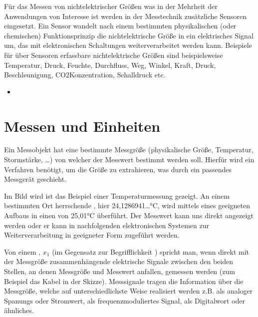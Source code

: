 \documentclass[letterpaper,10pt,english]{jupyterBook}
\begin{document}
\sphinxAtStartPar
Für das Messen von nicht\sphinxhyphen{}elektrischer Größen \sphinxhyphen{} was in der Mehrheit der Anwendungen von Interesse ist \sphinxhyphen{} werden in der Messtechnik zusätzliche Sensoren eingesetzt.
Ein Sensor wandelt nach einem bestimmten physikalischen (oder chemischen) Funktionsprinzip die nicht\sphinxhyphen{}elektrische Größe in ein elektrisches Signal um, das mit elektronischen Schaltungen weiterverarbeitet werden kann. Beispiele für über Sensoren erfassbare nicht\sphinxhyphen{}elektrische Größen sind beispielsweise Temperatur, Druck, Feuchte, Durchfluss, Weg, Winkel, Kraft, Druck, Beschleunigung, CO2\sphinxhyphen{}Konzentration, Schalldruck etc.
\begin{itemize}
\item {} 
\sphinxAtStartPar
{\hyperref[\detokenize{content/1_Messen_Einheit::doc}]{}}

\end{itemize}

\sphinxstepscope


\section{Messen und Einheiten}
\label{\detokenize{content/1_Messen_Einheit:messen-und-einheiten}}\label{\detokenize{content/1_Messen_Einheit::doc}}
\sphinxAtStartPar
Ein Messobjekt hat eine bestimmte Messgröße (physikalische Größe, Temperatur, Stormstärke, …) von welcher der Messwert bestimmt werden soll. Hierfür wird ein Verfahren benötigt, um die Größe zu extrahieren, was durch ein passendes Messgerät geschieht.

\sphinxAtStartPar
Im Bild wird ist das Beispiel einer Temperaturmessung gezeigt. An einem bestimmten Ort herrschende , hier 24,1286941…°C, wird mittels eines geeigneten Aufbaus in einen  von 25,01°C überführt.
Der Messwert kann uns direkt angezeigt werden oder er kann in nachfolgenden elektronischen Systemen zur Weiterverarbeitung in geeigneter Form zugeführt werden.

\sphinxAtStartPar
Von einem , \(x_1\) (im Gegensatz zur Begrifflichkeit ) spricht man, wenn direkt mit der Messgröße zusammenhängende elektrische Signale zwischen den beiden Stellen, an denen Messgröße und Messwert anfallen, gemessen werden (zum Beispiel das Kabel in der Skizze). Messsignale tragen die Information über die Messgröße, welche auf unterschiedlichste Weise realisiert werden z.B. als analoger Spanungs\sphinxhyphen{} oder Stromwert, als frequenzmoduliertes Signal, als Digitalwort oder ähnliches.
\end{document}
